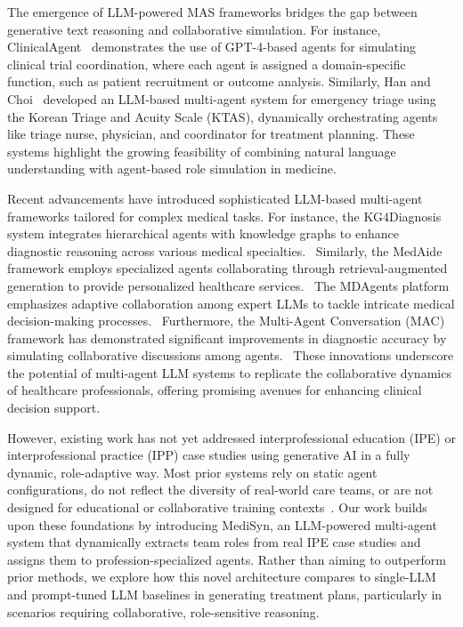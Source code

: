 \documentclass[pdflatex,sn-mathphys-num]{sn-jnl}%
\theoremstyle{thmstyleone}%
\theoremstyle{thmstyletwo}%
\theoremstyle{thmstylethree}%
\begin{document}
The emergence of LLM-powered MAS frameworks bridges the gap between generative text reasoning and collaborative simulation. For instance, ClinicalAgent~\cite{wang2024clinicalagent} demonstrates the use of GPT-4-based agents for simulating clinical trial coordination, where each agent is assigned a domain-specific function, such as patient recruitment or outcome analysis. Similarly, Han and Choi~\cite{han2024development} developed an LLM-based multi-agent system for emergency triage using the Korean Triage and Acuity Scale (KTAS), dynamically orchestrating agents like triage nurse, physician, and coordinator for treatment planning. These systems highlight the growing feasibility of combining natural language understanding with agent-based role simulation in medicine.

Recent advancements have introduced sophisticated LLM-based multi-agent frameworks tailored for complex medical tasks. For instance, the KG4Diagnosis system integrates hierarchical agents with knowledge graphs to enhance diagnostic reasoning across various medical specialties.~\cite{kg4diagnosis2024} Similarly, the MedAide framework employs specialized agents collaborating through retrieval-augmented generation to provide personalized healthcare services.~\cite{medaide2024} The MDAgents platform emphasizes adaptive collaboration among expert LLMs to tackle intricate medical decision-making processes.~\cite{mdagents2024} Furthermore, the Multi-Agent Conversation (MAC) framework has demonstrated significant improvements in diagnostic accuracy by simulating collaborative discussions among agents.~\cite{macframework2025} These innovations underscore the potential of multi-agent LLM systems to replicate the collaborative dynamics of healthcare professionals, offering promising avenues for enhancing clinical decision support.

However, existing work has not yet addressed interprofessional education (IPE) or interprofessional practice (IPP) case studies using generative AI in a fully dynamic, role-adaptive way. Most prior systems rely on static agent configurations, do not reflect the diversity of real-world care teams, or are not designed for educational or collaborative training contexts~\cite{wilk2016semantic, valmeek2023prompt}. Our work builds upon these foundations by introducing MediSyn, an LLM-powered multi-agent system that dynamically extracts team roles from real IPE case studies and assigns them to profession-specialized agents. Rather than aiming to outperform prior methods, we explore how this novel architecture compares to single-LLM and prompt-tuned LLM baselines in generating treatment plans, particularly in scenarios requiring collaborative, role-sensitive reasoning.
\end{document}

